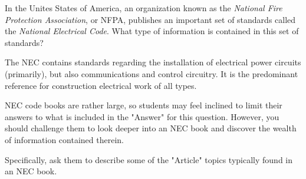 

In the Unites States of America, an organization known as the {\it National Fire Protection Association}, or NFPA, publishes an important set of standards called the {\it National Electrical Code}.  What type of information is contained in this set of standards?







The NEC contains standards regarding the installation of electrical power circuits (primarily), but also communications and control circuitry.  It is the predominant reference for construction electrical work of all types.







NEC code books are rather large, so students may feel inclined to limit their answers to what is included in the "Answer" for this question.  However, you should challenge them to look deeper into an NEC book and discover the wealth of information contained therein. 

Specifically, ask them to describe some of the "Article" topics typically found in an NEC book.




